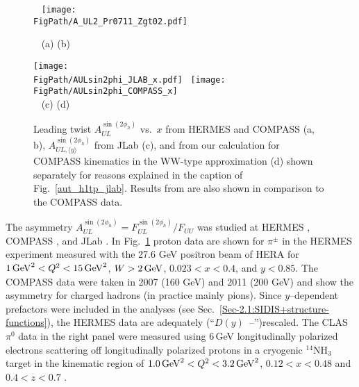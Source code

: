 \documentclass[a4paper,11pt]{article}
\newcommand{\blue}[1]{{\color{blue} #1}}
\newcommand{\ps}[1]{\blue{#1}}
\newcommand{\gs}[1]{{\color[rgb]{0.65,0,0.65}#1}}
\newcommand*{\FigPath}{./figs}%
\begin{document}
\begin{figure}
\centering \ \hspace{-6mm}
\texttt{[image: \\FigPath/A\_UL2\_Pr0711\_Zgt02.pdf]} \\

\vspace{-0.5cm}

\ \hspace{1cm} {\tiny (a)} \hspace{6cm} {\tiny (b)} 

\vspace{1cm}

\texttt{[image: \\FigPath/AULsin2phi\_JLAB\_x.pdf]} \
\texttt{[image: \\FigPath/AULsin2phi\_COMPASS\_x]} \\
\ \hspace{1cm} {\tiny (c)} \hspace{6cm} {\tiny (d)}
	\caption{\label{aul_jlab}
	Leading twist $A_{UL}^{\sin(2\phi_h)}$ vs.~$x$ from
	HERMES \cite{Airapetian:1999tv} and 
	COMPASS \cite{Parsamyan:2018ovx,Parsamyan:2018evv} (a, b),
	$A_{UL,  \langle y\rangle}^{\sin(2\phi_h)}$ from
	JLab \cite{Jawalkar:2017ube} (c),  and from our calculation 
	for COMPASS kinematics in the WW-type approximation (d)
	\ps{shown separately for reasons explained in the
	caption \gs{of} Fig.~\ref{aut_h1tp_jlab}.} Results
	from \cite{Avakian:2007mv} are also shown in comparison to the 
	COMPASS data.}
\end{figure}

The asymmetry $A_{UL}^{\sin(2\phi_h)}=F_{UL}^{\sin(2\phi_h)}/F_{UU}$  was
studied at HERMES \cite{Airapetian:1999tv,Airapetian:2002mf}, COMPASS
\cite{Parsamyan:2018ovx,Parsamyan:2018evv}, and JLab \cite{Avakian:2010ae,Jawalkar:2017ube}.
In Fig.~\ref{aul_jlab} proton data are shown for $\pi^\pm$ in the
HERMES experiment measured with the 27.6 GeV positron
beam of HERA for
$1\,{\rm GeV}^2 < Q^2 < 15 \,{\rm GeV}^2$, $W > 2\,{\rm GeV}$,
$0.023 < x < 0.4$, and $y < 0.85$.
The COMPASS data were taken in 2007 (160 GeV) and 2011 (200 GeV) and show
the asymmetry for charged hadrons (in practice mainly pions).
Since $y$--dependent prefactors were included in the analyses
(see Sec.~\ref{Sec-2.1:SIDIS+structure-functions}),
the HERMES data are adequately (``$D(y)$~--'')rescaled.
The CLAS $\pi^0$ data in the right panel were measured using 6$\,$GeV
longitudinally polarized electrons scattering off
longitudinally polarized protons in a cryogenic $^{14}$NH$_3$
target in the kinematic region of $1.0\,{\rm GeV}^2 < Q^2 < 3.2\,{\rm GeV}^2$,
$0.12 < x < 0.48$ and $0.4 < z < 0.7$ \cite{Jawalkar:2017ube}.
\end{document}
